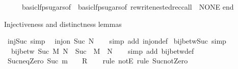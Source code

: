 \begin{isabellebody}
\ \ \ \ \ basic{\isacharunderscore}{\kern0pt}lfp{\isacharunderscore}{\kern0pt}sugars{\isacharunderscore}{\kern0pt}of\ {\isacharequal}{\kern0pt}\ basic{\isacharunderscore}{\kern0pt}lfp{\isacharunderscore}{\kern0pt}sugars{\isacharunderscore}{\kern0pt}of{\isacharcomma}{\kern0pt}\ rewrite{\isacharunderscore}{\kern0pt}nested{\isacharunderscore}{\kern0pt}rec{\isacharunderscore}{\kern0pt}call\ {\isacharequal}{\kern0pt}\ NONE{\isacharbraceright}{\kern0pt}\isanewline
end\isanewline
{\isacartoucheclose}%
\endisatagML
{\isafoldML}%
%
\isadelimML
%
\endisadelimML
%
\begin{isamarkuptext}%
Injectiveness and distinctness lemmas%
\end{isamarkuptext}\isamarkuptrue%
\isamarkupfalse%
\ inj{\isacharunderscore}{\kern0pt}Suc\ {\isacharbrackleft}{\kern0pt}simp{\isacharbrackright}{\kern0pt}{\isacharcolon}{\kern0pt}\isanewline
\ \ {\isachardoublequoteopen}inj{\isacharunderscore}{\kern0pt}on\ Suc\ N{\isachardoublequoteclose}\isanewline
%
\isadelimproof
\ \ %
\endisadelimproof
%
\isatagproof
{}\isamarkupfalse%
\ {\isacharparenleft}{\kern0pt}simp\ add{\isacharcolon}{\kern0pt}\ inj{\isacharunderscore}{\kern0pt}on{\isacharunderscore}{\kern0pt}def{\isacharparenright}{\kern0pt}%
\endisatagproof
{\isafoldproof}%
%
\isadelimproof
\isanewline
%
\endisadelimproof
\isanewline
{}\isamarkupfalse%
\ bij{\isacharunderscore}{\kern0pt}betw{\isacharunderscore}{\kern0pt}Suc\ {\isacharbrackleft}{\kern0pt}simp{\isacharbrackright}{\kern0pt}{\isacharcolon}{\kern0pt}\isanewline
\ \ {\isachardoublequoteopen}bij{\isacharunderscore}{\kern0pt}betw\ Suc\ M\ N\ {\isasymlongleftrightarrow}\ Suc\ {\isacharbackquote}{\kern0pt}\ M\ {\isacharequal}{\kern0pt}\ N{\isachardoublequoteclose}\isanewline
%
\isadelimproof
\ \ %
\endisadelimproof
%
\isatagproof
{}\isamarkupfalse%
\ {\isacharparenleft}{\kern0pt}simp\ add{\isacharcolon}{\kern0pt}\ bij{\isacharunderscore}{\kern0pt}betw{\isacharunderscore}{\kern0pt}def{\isacharparenright}{\kern0pt}%
\endisatagproof
{\isafoldproof}%
%
\isadelimproof
\isanewline
%
\endisadelimproof
\isanewline
{}\isamarkupfalse%
\ Suc{\isacharunderscore}{\kern0pt}neq{\isacharunderscore}{\kern0pt}Zero{\isacharcolon}{\kern0pt}\ {\isachardoublequoteopen}Suc\ m\ {\isacharequal}{\kern0pt}\ {}\ {\isasymLongrightarrow}\ R{\isachardoublequoteclose}\isanewline
%
\isadelimproof
\ \ %
\endisadelimproof
%
\isatagproof
{}\isamarkupfalse%
\ {\isacharparenleft}{\kern0pt}rule\ notE{\isacharparenright}{\kern0pt}\ {\isacharparenleft}{\kern0pt}rule\ Suc{\isacharunderscore}{\kern0pt}not{\isacharunderscore}{\kern0pt}Zero{\isacharparenright}{\kern0pt}%

\end{isabellebody}
